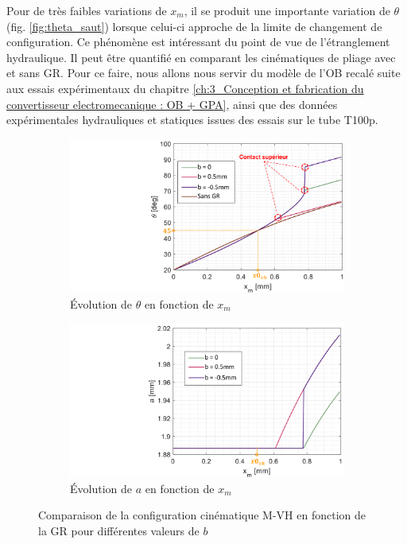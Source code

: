 Pour de très faibles variations de $x_m$, il se produit une importante variation de $\theta$ (fig. \ref{fig:theta_saut}) lorsque celui-ci approche de la limite de changement de configuration. Ce phénomène est intéressant du point de vue de l'étranglement hydraulique. Il peut être quantifié en comparant les cinématiques de pliage avec et sans GR. Pour ce faire, nous allons nous servir du modèle de l'OB recalé suite aux essais expérimentaux du chapitre \ref{ch:3_Conception et fabrication du convertisseur electromecanique : OB + GPA}, ainsi que des données expérimentales hydrauliques et statiques issues des essais sur le tube T100p.
\begin{figure}[!htb]
\begin{center}
	\begin{subfigure}[b]{0.49\textwidth}
    	\captionsetup{justification=centering}
		\includegraphics[trim={10cm 0cm 0cm 0cm},clip,width=.96\textwidth]{../Chap6/Figure/theta_vs_xm_avec_et_sans_gaine_tot.pdf}
		\caption{Évolution de $\theta$ en fonction de $x_m$}
		\label{fig:theta_vs_xm_avec_et_sans_gaine_tot}
	\end{subfigure}
\hfillx
	\begin{subfigure}[b]{0.49\textwidth}
    	\captionsetup{justification=centering}
		\includegraphics[trim={9.5cm 0cm 0cm 0cm},clip,width=.99\textwidth]{../Chap6/Figure/a_vs_xm_avec_et_sans_gaine_tot.pdf}
		\caption{Évolution de $a$ en fonction de $x_m$}
		\label{fig:a_vs_xm_avec_et_sans_gaine_tot}  
	\end{subfigure}
	\caption{Comparaison de la configuration cinématique M-VH en fonction de la GR pour différentes valeurs de $b$}
	\label{fig:(theta&a)_vs_xm_avec_et_sans_gaine_tot}
\end{center}	
\end{figure} 

